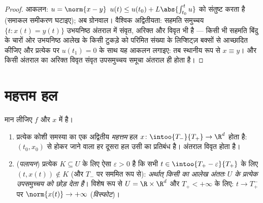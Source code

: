 \begin{proof}
आकलन: $u = \norm{x - y}$ $u(t) \leq u(t_0)
+ L\abs{\int_{t_0}^tu}$ को संतुष्ट करता है (समाकल समीकरण घटाइए); अब
ग्रोनवाल। वैश्विक अद्वितीयता: सहमति समुच्चय $\{t : x(t)
= y(t)\}$ उभयनिष्ठ अंतराल
में संवृत, अरिक्त और विवृत भी है --- किसी भी सहमति बिंदु के चारों
ओर उभयनिष्ठ आलेख के किसी  टुकड़े को परिमित संख्या के लिप्शिट्ज़
बक्सों से आच्छादित कीजिए और प्रत्येक पर $u(t_1) = 0$ के साथ यह आकलन
लगाइए: तब स्थानीय रूप से $x \equiv y$। और किसी अंतराल का अरिक्त विवृत
संवृत उपसमुच्चय समूचा अंतराल ही होता है।
\end{proof}

\section{महत्तम हल}

\begin{theorem}[महत्तम हल; संहतों से पलायन]
\label{thm:b3:ode:maximal}
मान लीजिए $f$  और $x$ में  है।
\begin{enumerate}
  \item प्रत्येक कोशी समस्या का एक अद्वितीय \emph{महत्तम} हल
        $x \colon \intoo{T_-}{T_+} \to \R^d$ होता है: $(t_0, x_0)$ से होकर जाने वाला हर दूसरा हल उसी का
        प्रतिबंध है। अंतराल विवृत होता है।
  \item (\emph{पलायन}) प्रत्येक  $K \subseteq U$ के लिए ऐसा $\varepsilon > 0$ है कि
        सभी $t \in \intoo{T_+ - \varepsilon}{T_+}$ के लिए $(t, x(t)) \notin
        K$ (और $T_-$ पर सममित रूप से):
        \emph{अर्थात् किसी  का आलेख अंततः $U$ के
        प्रत्येक  उपसमुच्चय को छोड़ देता है}। विशेष रूप से
        $U = \R\times\R^d$ और $T_+ < +\infty$ के लिए: $t \to T_+^-$ पर $\norm{x(t)} \to +\infty$
        (\emph{विस्फोट})।
\end{enumerate}
\end{theorem}

